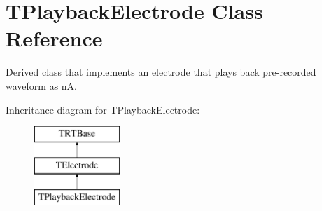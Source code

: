 \hypertarget{class_t_playback_electrode}{\section{T\+Playback\+Electrode Class Reference}
\label{class_t_playback_electrode}
}


Derived class that implements an electrode that plays back pre-\/recorded waveform as n\+A.  


Inheritance diagram for T\+Playback\+Electrode\+:\begin{figure}[H]
\begin{center}
\leavevmode
\includegraphics[height=3.000000cm]{class_t_playback_electrode}
\end{center}
\end{figure}
